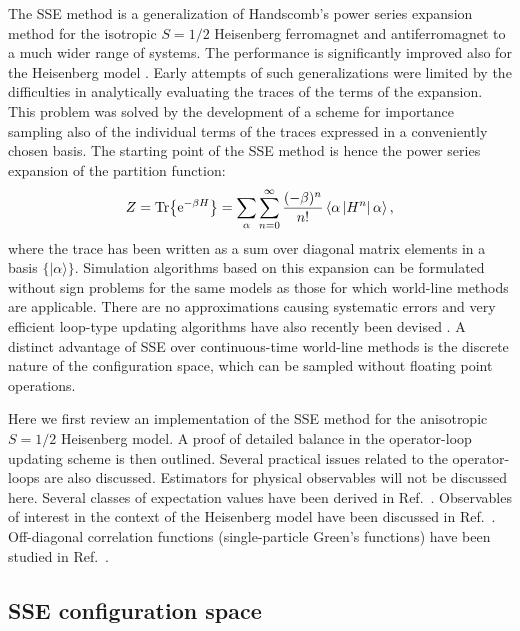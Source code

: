 \documentclass[10pt,pre,aps,twocolumn,showpacs,superscriptaddress,
floatfix]{revtex4}
\begin{document}
The SSE method is a generalization \cite{sse1,sse2,sse3} of Handscomb's 
power series expansion method for the isotropic $S=1/2$ Heisenberg ferromagnet
\cite{handscomb} and antiferromagnet \cite{lyklema,lee} to a much wider range 
of systems. The performance is significantly improved also for the Heisenberg 
model \cite{sse4,ssespin1,ssespin2}. Early attempts of such generalizations 
\cite{chakravarty} were limited by the difficulties in analytically 
evaluating the traces of the terms of the expansion. This problem was solved 
\cite{sse1,sse2} by the development of a scheme for importance sampling also
of the individual terms of the traces expressed in a conveniently chosen 
basis. The starting point of the SSE method is hence the power series 
expansion of the partition function:
\begin{eqnarray}
Z =  {\rm Tr}\bigl\lbrace {\rm e}^{-\beta H} \bigr\rbrace
  =  \sum\limits_{\alpha}\sum\limits_{n=0}^\infty {(-\beta)^n \over n!} 
     \left \langle \alpha \left | H^n \right |\alpha \right \rangle ,
\label{zn1}
\end{eqnarray}
where the trace has been written as a sum over diagonal matrix elements in a
basis $\{|\alpha \rangle\}$. Simulation algorithms based on this expansion can
be formulated without sign problems for the same models as those for which 
world-line methods \cite{worldline} are applicable. There are no 
approximations causing systematic errors and very efficient loop-type updating 
algorithms have also recently been devised \cite{sse3,pinaki,athens,henelius2}.
A distinct advantage of SSE over continuous-time world-line methods 
\cite{prokofev,beard} is the discrete nature of the configuration space, 
which can be sampled without floating point operations.

Here we first review an implementation of the SSE method for the anisotropic 
$S=1/2$ Heisenberg model. A proof of detailed balance in the operator-loop 
updating scheme is then outlined. Several practical issues related to the 
operator-loops are also discussed. Estimators for physical observables will 
not be discussed here. Several classes of expectation values have been derived
in Ref.~. Observables of interest in the context of the 
Heisenberg model have been discussed in Ref.~. Off-diagonal 
correlation functions (single-particle Green's functions) have been 
studied in Ref.~.

\subsection{SSE configuration space}
\end{document}
